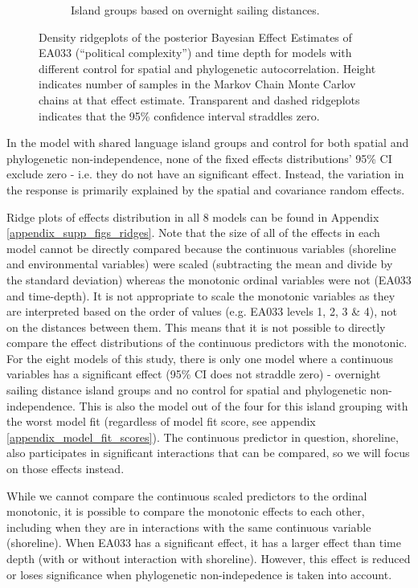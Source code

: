 \documentclass[unnumsec,webpdf,modern,medium]{oup-authoring-template}
\begin{document}
\begin{figure}
\begin{subfigure}{0.48\textwidth}
\caption{Island groups based on overnight sailing distances.}
\label{SBZR_ridge_panels_plot_time_pol_complex}
\end{subfigure}
\caption{Density ridgeplots of the posterior Bayesian Effect Estimates of EA033 (``political complexity'') and time depth for models with different control for spatial and phylogenetic autocorrelation. Height indicates number of samples in the Markov Chain Monte Carlov chains at that effect estimate. Transparent and dashed ridgeplots indicates that the 95\% confidence interval straddles zero. }
\label{Ridgeplots_pol_complex_time_depth}
\end{figure}










In the model with shared language island groups and control for both spatial and phylogenetic non-independence, none of the fixed effects distributions' 95\% CI exclude zero - i.e. they do not have an significant effect. Instead, the variation in the response is primarily explained by the spatial and covariance random effects.

Ridge plots of effects distribution in all 8 models can be found in Appendix \ref{appendix_supp_figs_ridges}. Note that the size of all of the effects in each model cannot be directly compared because the continuous variables (shoreline and environmental variables) were scaled (subtracting the mean and divide by the standard deviation) whereas the monotonic ordinal variables were not (EA033 and time-depth). It is not appropriate to scale the monotonic variables as they are interpreted based on the order of values (e.g. EA033 levels 1, 2, 3 \& 4), not on the distances between them. This means that it is not possible to directly compare the effect distributions of the continuous predictors with the monotonic. For the eight models of this study, there is only one model where a continuous variables has a significant effect (95\% CI does not straddle zero) - overnight sailing distance island groups and no control for spatial and phylogenetic non-independence. This is also the model out of the four for this island grouping with the worst model fit (regardless of model fit score, see appendix \ref{appendix_model_fit_scores}). The continuous predictor in question, shoreline, also participates in significant interactions that can be compared, so we will focus on those effects instead.

While we cannot compare the continuous scaled predictors to the ordinal monotonic, it is possible to compare the monotonic effects to each other, including when they are in interactions with the same continuous variable (shoreline). When EA033 has a significant effect, it has a larger effect than time depth (with or without interaction with shoreline). However, this effect is reduced or loses significance when phylogenetic non-indepedence is taken into account.
\end{document}
